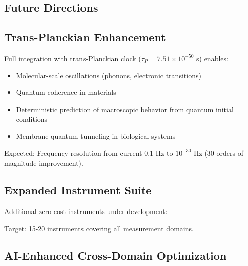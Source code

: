 \documentclass[12pt,a4paper]{article}
\begin{document}
{{{{{{{{{{{{{{{{{\begin{algorithm}
{{{{{{{{{\section{Future Directions}

\subsection{Trans-Planckian Enhancement}

Full integration with trans-Planckian clock ($\tau_P = 7.51 \times 10^{-50}$ s) enables:

\begin{itemize}
\item Molecular-scale oscillations (phonons, electronic transitions)
\item Quantum coherence in materials
\item Deterministic prediction of macroscopic behavior from quantum initial conditions
\item Membrane quantum tunneling in biological systems
\end{itemize}

Expected: Frequency resolution from current 0.1 Hz to $10^{-30}$ Hz (30 orders of magnitude improvement).

\subsection{Expanded Instrument Suite}

Additional zero-cost instruments under development:

\begin{itemize}
\item \textbf{Ultrasonic material tester}: Speaker + microphone (time-of-flight, thickness, defects)
\item \textbf{Hyperspectral imager**: Camera + scanning (2D spatial + spectral cube)
\item \textbf{Magnetic resonance}: Speaker coils (low-field NMR at kHz range)
\item \textbf{Electrochemical analyzer**: USB power + electrodes (voltammetry, impedance)
\end{itemize}

Target: 15-20 instruments covering all measurement domains.

\subsection{AI-Enhanced Cross-Domain Optimization}

}}}}}}}}}
\end{algorithm}}}}}}}}}}}}}}}}}}
\end{document}
